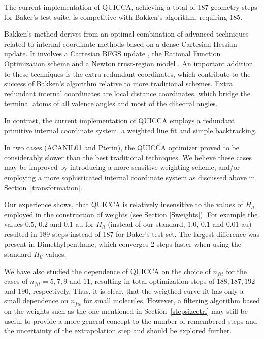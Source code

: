 \documentclass[prl,twocolumn,showpacs,twocolumngrid,superbib]{revtex4}
\begin{document}
The current implementation of QUICCA, achieving a total of 187 geometry steps for Baker's test suite, is 
competitive with Bakken's algorithm, requiring 185.  

Bakken's method \cite{VBakken02} derives from an optimal combination of advanced techniques
related to internal coordinate methods based on a dense Cartesian Hessian update. It involves 
a Cartesian BFGS update \cite{RFletcher81}, the Rational Function Optimization scheme \cite{ABanerji85} 
and a Newton trust-region model \cite{RFletcher81}. An important addition to these techniques is the 
extra redundant coordinates, which contribute to the success of Bakken's algorithm relative to more 
traditional schemes. Extra redundant internal coordinates are local distance coordinates, which bridge 
the terminal atoms of all valence angles and most of the dihedral angles.

In contrast, the current implementation of QUICCA employs a redundant primitive internal coordinate 
system, a weighted line fit and simple backtracking.  

In two cases (ACANIL01 and Pterin), the QUICCA optimizer proved to be considerably slower 
than the best traditional techniques.   We believe these cases may be improved by introducing a
more sensitive weighting scheme, and/or employing a more sophisticated internal coordinate
system as discussed above in Section~\ref{transformation}.

Our experience shows, that QUICCA is relatively insensitive to the values of $H_{ll}$ employed 
in the construction of weights (see Section \ref{Sweights}).   For example the values $0.5$, $0.2$ 
and $0.1$ au for $H_{ll}$ (instead of our standard, $1.0$, $0.1$ and $0.01$ au)
resulted in 189 steps instead of 187 for Baker's test set.  The largest difference was present 
in Dimethylpenthane, which converges 2 steps faster when using the standard $H_{ll}$ values. 

We have also studied the dependence of QUICCA on the choice of $n_{fit}$
for the cases of $n_{fit}=5,7,9$ and $11$, resulting in total optimization
steps of $188, 187, 192$ and $190$, respectively. 
Thus, it is clear, that the weigthed curve fit has only a small
dependence on $n_{fit}$ for small molecules.
However, a filtering algorithm based on the weights such as 
the one mentioned in Section~\ref{stepsizectrl}
may still be useful to provide a more general concept to the 
number of remembered steps  and the uncertainty of the extrapolation 
step and should be explored further.
\end{document}
